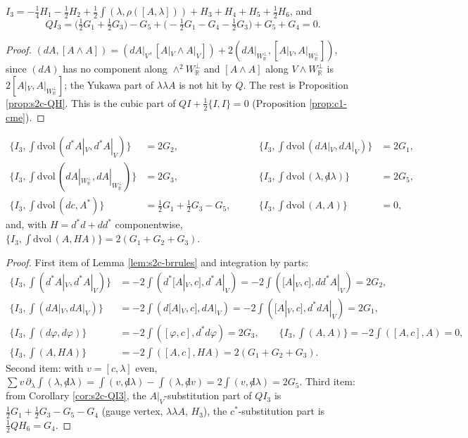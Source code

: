 \begin{corollary}[$QI_3=0$]
\label{cor:s2c-QI3}
$I_3=-\tfrac14H_1-\tfrac12H_2+\tfrac12\int(\lambda,\rho([A,\lambda]))+H_3+H_4+H_5+\tfrac12H_6$, and
\[
QI_3=\big(\tfrac12G_1+\tfrac12G_3\big)-G_5+\big(-\tfrac12G_1-G_4-\tfrac12G_3\big)+G_5+G_4=0 .
\]
\end{corollary}

\begin{proof}
$(dA,[A\wedge A])=(dA|_V,[A|_V\wedge A|_V])+2(dA|_{W_{\mathbb R}^\perp},[A|_V,A|_{W_{\mathbb R}^\perp}])$, since $(dA)$ has no component along $\wedge^2W_{\mathbb R}^\perp$ and $[A\wedge A]$ along $V\wedge W_{\mathbb R}^\perp$ is $2[A|_V,A|_{W_{\mathbb R}^\perp}]$; the Yukawa part of $\lambda\lambda A$ is not hit by $Q$. The rest is Proposition \ref{prop:s2c-QH}. This is the cubic part of $QI+\tfrac12\{I,I\}=0$ (Proposition \ref{prop:c1-cme}).
\end{proof}

\begin{proposition}
\label{prop:s2c-br}
\[
\begin{aligned}
\Big\{I_3,\int\mathrm{dvol}\,(d^*A|_V,d^*A|_V)\Big\}&=2G_2, &\qquad \Big\{I_3,\int\mathrm{dvol}\,(dA|_V,dA|_V)\Big\}&=2G_1,\\
\Big\{I_3,\int\mathrm{dvol}\,(dA|_{W_{\mathbb R}^\perp},dA|_{W_{\mathbb R}^\perp})\Big\}&=2G_3, &\qquad \Big\{I_3,\int\mathrm{dvol}\,(\lambda,{\not d}\lambda)\Big\}&=2G_5,\\
\Big\{I_3,\int\mathrm{dvol}\,(dc,A^*)\Big\}&=\tfrac12G_1+\tfrac12G_3-G_5, &\qquad \Big\{I_3,\int\mathrm{dvol}\,(A,A)\Big\}&=0,
\end{aligned}
\]
and, with $H=d^*d+dd^*$ componentwise, $\{I_3,\int\mathrm{dvol}\,(A,HA)\}=2(G_1+G_2+G_3)$.
\end{proposition}

\begin{proof}
First item of Lemma \ref{lem:s2c-brrules} and integration by parts:
\[
\begin{aligned}
\Big\{I_3,\int(d^*A|_V,d^*A|_V)\Big\}&=-2\int(d^*[A|_V,c],d^*A|_V)=-2\int([A|_V,c],dd^*A|_V)=2G_2,\\
\Big\{I_3,\int(dA|_V,dA|_V)\Big\}&=-2\int(d[A|_V,c],dA|_V)=-2\int([A|_V,c],d^*dA|_V)=2G_1,\\
\Big\{I_3,\int(d\varphi,d\varphi)\Big\}&=-2\int([\varphi,c],d^*d\varphi)=2G_3,\qquad \Big\{I_3,\int(A,A)\Big\}=-2\int([A,c],A)=0,\\
\Big\{I_3,\int(A,HA)\Big\}&=-2\int([A,c],HA)=2(G_1+G_2+G_3).
\end{aligned}
\]
Second item: with $v=[c,\lambda]$ even, $\sum v\,\partial_\lambda\int(\lambda,{\not d}\lambda)=\int(v,{\not d}\lambda)-\int(\lambda,{\not d}v)=2\int(v,{\not d}\lambda)=2G_5$. Third item: from Corollary \ref{cor:s2c-QI3}, the $A|_V$-substitution part of $QI_3$ is $\tfrac12G_1+\tfrac12G_3-G_5-G_4$ (gauge vertex, $\lambda\lambda A$, $H_3$), the $c^*$-substitution part is $\tfrac12QH_6=G_4$.
\end{proof}


